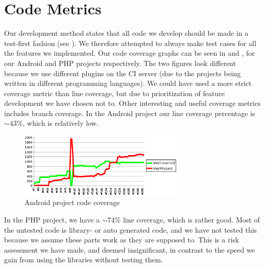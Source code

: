 
\section{Code Metrics}
\label{sec:automated_unit_test}

Our development method states that all code we develop should be made in a test-first fashion (see ). We therefore attempted to always make test cases for all the features we implemented. Our code coverage graphs can be seen in  and , for our Android and PHP projects respectively. The two figures look different because we use different plugins on the CI server (due to the projects being written in different programming languages). We could have used a more strict coverage metric than line coverage, but due to prioritization of feature development we have chosen not to. Other interesting and useful coverage metrics includes branch coverage. In the Android project our line coverage percentage is $\sim 43\%$, which is relatively low. %


\begin{figure}[!htbp]
    \centering
    \includegraphics[width=0.7\textwidth]{graphic/quality_assurance/jenkins_android_code_coverage}
    \caption{Android project code coverage}
    \label{fig:android_project_code_coverage}
\end{figure}
\FloatBarrier

In the PHP project, we have a $\sim 74\%$ line coverage, which is rather good. Most of the untested code is library- or auto generated code, and we have not tested this because we assume these parts work as they are supposed to. This is a risk assessment we have made, and deemed insignificant, in contrast to the speed we gain from using the libraries without testing them. %

